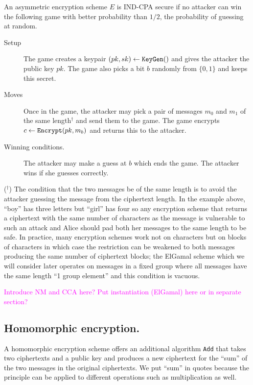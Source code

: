 \documentclass{llncs}
\newcommand{\alg}[1]{\textup{\texttt{#1}}}
\begin{document}
\begin{definition}
An asymmetric encryption scheme $E$ is IND-CPA secure if no attacker can win the
following game with better probability than $1/2$, the probability of guessing
at random.

\begin{description}
\item[Setup] The game creates a keypair $(pk, sk) \gets \alg{KeyGen}()$ and
gives the attacker the public key $pk$. The game also picks a bit $b$ randomly
from $\{0, 1\}$ and keeps this secret.
\item[Moves] Once in the game, the attacker may pick a pair of messages $m_0$
and $m_1$ of the same length$^\dagger$ and send them to the game. The game
encrypts $c \gets \alg{Encrypt} (pk, m_b)$ and returns this to the attacker.
\item[Winning conditions.] The attacker may make a guess at $b$ which ends the
game. The attacker wins if she guesses correctly.
\end{description}
\end{definition}

\noindent($^\dagger$) The condition that the two messages be of the same length
is to avoid the attacker guessing the message from the ciphertext length. In the
example above, ``boy'' has three letters but ``girl'' has four so any encryption
scheme that returns a ciphertext with the same number of characters as the
message is vulnerable to such an attack and Alice should pad both her messages
to the same length to be safe. In practice, many encryption schemes work not on
characters but on blocks of characters in which case the restriction can be
weakened to both messages producing the same number of ciphertext blocks; the
ElGamal scheme which we will consider later operates on messages in a fixed
group where all messages have the same length ``1 group element'' and this
condition is vacuous.

\textcolor{Fuchsia}{Introduce NM and CCA here? Put instantiation (ElGamal) here or in separate section?}

\subsection{Homomorphic encryption.}
A homomorphic encryption scheme offers an additional algorithm \alg{Add} that takes two ciphertexts and a public key and produces a new ciphertext for the ``sum'' of the two messages in the original ciphertexts. We put ``sum'' in quotes because the principle can be applied to different operations such as multiplication as well.
\end{document}

